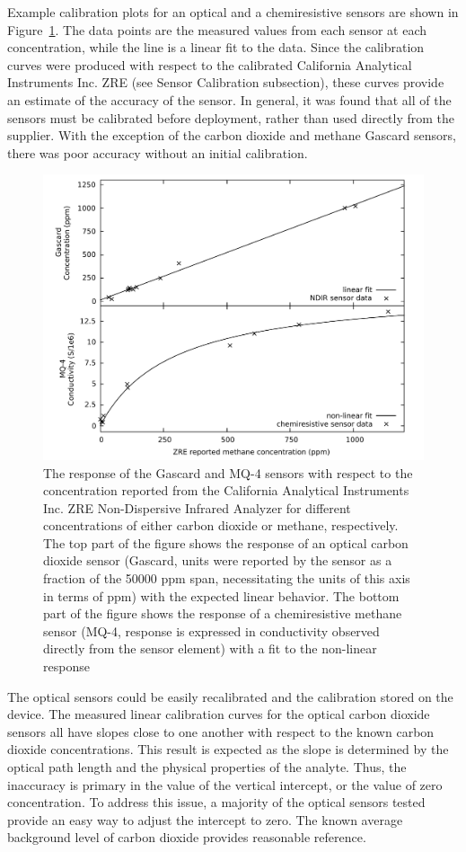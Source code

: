 \documentclass[times]{joehreview}
\begin{document}
	Example calibration plots for an optical and a chemiresistive sensors are shown in Figure~\ref{fig:gascardcodiff}. The data points are the measured values from each sensor at each concentration, while the line is a linear fit to the data.  Since the calibration curves were produced with respect to the calibrated California Analytical Instruments Inc. ZRE (see Sensor Calibration subsection), these curves provide an estimate of the accuracy of the sensor.  In general, it was found that all of the sensors must be calibrated before deployment, rather than used directly from the supplier.  With the exception of the carbon dioxide and methane Gascard sensors, there was poor accuracy without an initial calibration.
	
	\begin{figure}[!t]
		\centering
		\includegraphics[width=0.9\columnwidth]{honey9.pdf}
		\caption{The response of the Gascard and MQ-4 sensors with respect to the concentration reported from the California Analytical Instruments Inc. ZRE Non-Dispersive Infrared Analyzer for different concentrations of either carbon dioxide or methane, respectively.  The top part of the figure shows the response of an optical carbon dioxide sensor (Gascard, units were reported by the sensor as a fraction of the 50000 ppm span, necessitating the units of this axis in terms of ppm) with the expected linear behavior.  The bottom part of the figure shows the response of a chemiresistive methane sensor (MQ-4, response is expressed in conductivity observed directly from the sensor element) with a fit to the non-linear response}
		\label{fig:gascardcodiff}
	\end{figure}
	
	The optical sensors could be easily recalibrated and the calibration stored on the device.  The measured linear calibration curves for the optical carbon dioxide sensors all have slopes close to one another with respect to the known carbon dioxide concentrations.  This result is expected as the slope is determined by the optical path length and the physical properties of the analyte.  Thus, the inaccuracy is primary in the value of the vertical intercept, or the value of zero concentration.  To address this issue, a majority of the optical sensors tested provide an easy way to adjust the intercept to zero.  The known average background level of carbon dioxide provides reasonable reference.
	
\end{document}

